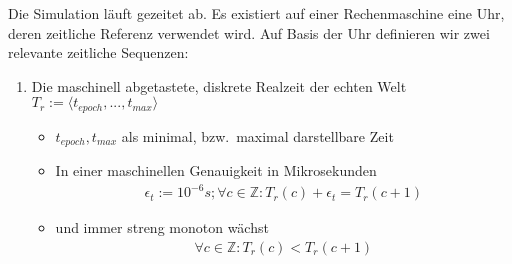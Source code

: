 Die Simulation läuft gezeitet ab.
Es existiert auf einer Rechenmaschine eine Uhr, deren zeitliche Referenz verwendet wird.
Auf Basis der Uhr definieren wir zwei relevante zeitliche Sequenzen:
\begin{enumerate}
\item Die maschinell abgetastete, diskrete Realzeit der echten Welt $T_r:=\langle t_{epoch}, ... , t_{max}\rangle$

\begin{itemize}
	\item $t_{epoch}, t_{max}$ als minimal, bzw.~maximal darstellbare Zeit
	\item In einer maschinellen Genauigkeit in Mikrosekunden 
\begin{align}
	\epsilon_t:=10^{-6}s ; \forall c \in \mathbb{Z}: T_r(c) + \epsilon_t = T_r(c+1)
\end{align}
	\item und immer streng monoton wächst 
\begin{align}
	\forall c \in \mathbb{Z}: T_r(c) < T_r(c+1)
\end{align}
	\end{itemize}


\end{enumerate}
